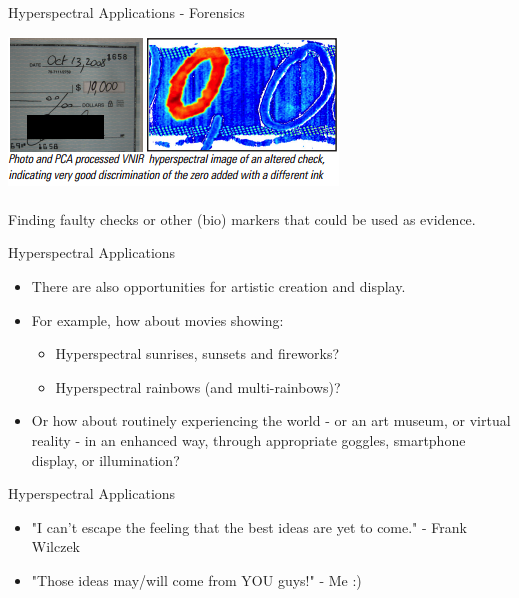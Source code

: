 \documentclass{beamer}
\begin{document}
\begin{frame}{Hyperspectral Applications - Forensics}
   \begin{center}
      \includegraphics[width=\textwidth]{figures/forensics.png}
      \\~\\Finding faulty checks or other (bio) markers that could be used as evidence.
   \end{center}
\end{frame}

\begin{frame}{Hyperspectral Applications}
   \begin{itemize}
      \item There are also opportunities for artistic creation and display.
      \item For example, how about movies showing:
      \begin{itemize}
         \item Hyperspectral sunrises, sunsets and fireworks?
         \item Hyperspectral rainbows (and multi-rainbows)?
      \end{itemize}
      \item Or how about routinely experiencing the world - or an art museum, or virtual reality - in an enhanced way, through appropriate goggles, smartphone display, or illumination?
   \end{itemize}
\end{frame}

\begin{frame}{Hyperspectral Applications}
   \begin{itemize}
      \item "I can't escape the feeling that the best ideas are yet to come." - Frank Wilczek
      \item "Those ideas may/will come from YOU guys!" - Me :)
   \end{itemize}
\end{frame}
\end{document}
